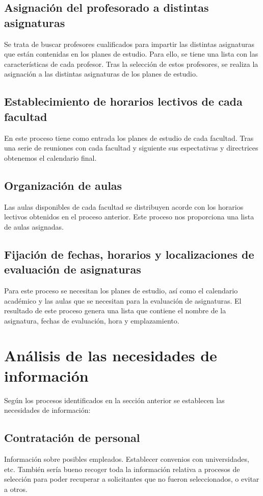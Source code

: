 \documentclass[11pt,a4paper,spanish,twoside]{book}
\begin{document}
\subsection{Asignación del profesorado a distintas asignaturas}
Se trata de buscar profesores cualificados para impartir las distintas
asignaturas que están contenidas en los planes de estudio. Para ello, se
tiene una lista con las características de cada profesor. Tras la selección
de estos profesores, se realiza la asignación a las distintas asignaturas de
los planes de estudio.
 
\subsection{Establecimiento de horarios lectivos de cada facultad}
En este proceso tiene como entrada los planes de estudio de cada
facultad. Tras una serie de reuniones con cada facultad y siguiente sus
espectativas y directrices obtenemos el calendario final.

\subsection{Organización de aulas}
Las aulas disponibles de cada facultad se distribuyen acorde con los horarios
lectivos obtenidos en el proceso anterior. Este proceso nos proporciona una
lista de aulas asignadas. 

\subsection{Fijación de fechas, horarios y localizaciones de evaluación de
  asignaturas}
Para este proceso se necesitan los planes de estudio, así como el calendario
académico y las aulas que se necesitan para la evaluación de asignaturas. El
resultado de este proceso genera una lista que contiene el nombre de la
asignatura, fechas de evaluación, hora y emplazamiento. 

\section{Análisis de las necesidades de información}
Según los procesos identificados en la sección anterior se establecen las
necesidades de información: 

\subsection{Contratación de personal}
Información sobre posibles empleados. Establecer convenios con universidades,
etc. También sería bueno recoger toda la información relativa a procesos de
selección para poder recuperar a solicitantes que no fueron seleccionados, o
evitar a otros.  
\end{document}
